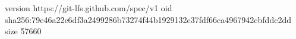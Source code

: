 version https://git-lfs.github.com/spec/v1
oid sha256:79e46a22c6df3a2499286b73274f44b1929132c37fdf66ca4967942cbfddc2dd
size 57660
